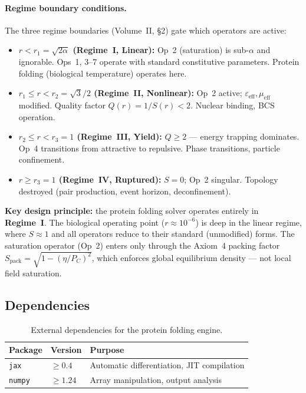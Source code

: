 \paragraph{Regime boundary conditions.}
The three regime boundaries (Volume~II, \S2) gate which operators are active:
\begin{itemize}
    \item \textbf{$r < r_1 = \sqrt{2\alpha}$ (Regime~I, Linear):}
          Op~2 (saturation) is sub-$\alpha$ and ignorable.
          Ops~1, 3--7 operate with standard constitutive parameters.
          Protein folding (biological temperature) operates here.
    \item \textbf{$r_1 \leq r < r_2 = \sqrt{3}/2$ (Regime~II, Nonlinear):}
          Op~2 active; $\varepsilon_\text{eff}, \mu_\text{eff}$ modified.
          Quality factor $Q(r) = 1/S(r) < 2$.
          Nuclear binding, BCS operation.
    \item \textbf{$r_2 \leq r < r_3 = 1$ (Regime~III, Yield):}
          $Q \geq 2$ --- energy trapping dominates.
          Op~4 transitions from attractive to repulsive.
          Phase transitions, particle confinement.
    \item \textbf{$r \geq r_3 = 1$ (Regime~IV, Ruptured):}
          $S = 0$; Op~2 singular.
          Topology destroyed (pair production, event horizon,
          deconfinement).
\end{itemize}

\noindent\textbf{Key design principle:} the protein folding solver operates entirely in \textbf{Regime~I}.  The biological operating point ($r \approx 10^{-6}$) is deep in the linear regime, where $S \approx 1$ and all operators reduce to their standard (unmodified) forms.  The saturation operator (Op~2) enters only through the Axiom~4 packing factor $S_\text{pack} = \sqrt{1 - (\eta/P_C)^2}$, which enforces global equilibrium density --- not local field saturation.

\subsection{Dependencies}

\begin{table}[H]
\centering
\caption{External dependencies for the protein folding engine.}
\label{tab:dependencies}
\small
\begin{tabular}{@{}l l l@{}}
\toprule
\textbf{Package} & \textbf{Version} & \textbf{Purpose} \\
\midrule
\texttt{jax}   & $\geq 0.4$ & Automatic differentiation, JIT compilation \\
\texttt{numpy} & $\geq 1.24$ & Array manipulation, output analysis \\
\bottomrule
\end{tabular}
\end{table}

